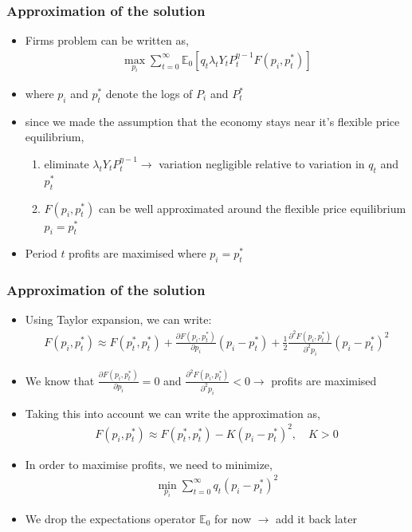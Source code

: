 \documentclass[10pt, xcolor=x11names, table]{beamer}
\begin{document}
\begin{frame}
\frametitle{Approximation of the solution}
\small
\begin{itemize}
\item Firms problem can be written as,
\begin{align*}
\max_{p_i}\sum^{\infty}_{t=0} \mathbb{E}_{0} \left[q_{t}\lambda_{t}Y_{t}P_{t}^{\eta-1}F(p_{i}, p_{t}^{*})\right]
\end{align*}
\item where $p_{i}$ and $p_{t}^{*}$ denote the logs of $P_{i}$ and $P_{t}^{*}$
\item since we made the assumption that the economy stays near it's flexible price equilibrium,
\begin{enumerate}
  \item eliminate $\lambda_{t}Y_{t}P_{t}^{\eta-1} \rightarrow$ variation negligible relative to variation in $q_{t}$ and $p_{t}^{*}$
  \item $F(p_{i}, p^{*}_{t})$ can be well approximated around the flexible price equilibrium $p_{i} = p_{t}^{*}$
\end{enumerate}
\item Period $t$ profits are maximised where $p_{i} = p_{t}^{*}$
\end{itemize}
\end{frame}

\begin{frame}
\frametitle{Approximation of the solution}
\small
\begin{itemize}
\item Using Taylor expansion, we can write:
\begin{align*}
F(p_{i}, p_{t}^{*}) \approx F(p_{t}^{*}, p_{t}^{*}) + \frac{{\partial}F(p_{i}, p_{t}^{*})}{\partial{p_{i}}}(p_{i} - p_{t}^{*}) + \frac{1}{2}\frac{{\partial^{2}}F(p_{i}, p_{t}^{*})}{\partial^{2}{p_{i}}}(p_{i} - p_{t}^{*})^{2}
\end{align*}
\item We know that $\textstyle \frac{{\partial}F(p_{i}, p_{t}^{*})}{\partial{p_{i}}} = 0$ and  $\textstyle \frac{{\partial^{2}}F(p_{i}, p_{t}^{*})}{\partial^{2}{p_{i}}} < 0 \rightarrow$ profits are maximised
\item Taking this into account we can write the approximation as,
\begin{align*}
F(p_{i}, p_{t}^{*}) \approx F(p_{t}^{*}, p_{t}^{*}) - K(p_{i} - p_{t}^{*})^{2}, \quad K>0
\end{align*}
\item In order to maximise profits, we need to minimize,
\begin{align*}
\min_{p_{i}} \sum_{t=0}^{\infty}q_{t}(p_{i} - p_{t}^{*})^{2}
\end{align*}
\item We drop the expectations operator $\mathbb{E}_{0}$ for now $\rightarrow$ add it back later
\end{itemize}
\end{frame}
\end{document}
